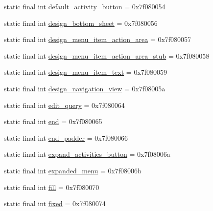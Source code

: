 \begin{DoxyCompactItemize}
\item 
static final int \mbox{\hyperlink{classandroid_1_1support_1_1design_1_1_r_1_1id_a1a434ee67ff2e4175b72e56f1a43d697}{default\+\_\+activity\+\_\+button}} = 0x7f080054
\item 
static final int \mbox{\hyperlink{classandroid_1_1support_1_1design_1_1_r_1_1id_aba38ef769e7a95935e5ae2f4fedea9d6}{design\+\_\+bottom\+\_\+sheet}} = 0x7f080056
\item 
static final int \mbox{\hyperlink{classandroid_1_1support_1_1design_1_1_r_1_1id_adb2647c3319106f9b429a3b5504f5ba5}{design\+\_\+menu\+\_\+item\+\_\+action\+\_\+area}} = 0x7f080057
\item 
static final int \mbox{\hyperlink{classandroid_1_1support_1_1design_1_1_r_1_1id_a8717eee55584a09abece563b626b9709}{design\+\_\+menu\+\_\+item\+\_\+action\+\_\+area\+\_\+stub}} = 0x7f080058
\item 
static final int \mbox{\hyperlink{classandroid_1_1support_1_1design_1_1_r_1_1id_ab894ddc87ea19e63dea6cc1573857be7}{design\+\_\+menu\+\_\+item\+\_\+text}} = 0x7f080059
\item 
static final int \mbox{\hyperlink{classandroid_1_1support_1_1design_1_1_r_1_1id_ad2aa9a71ea43bc8d7fdb4b1dee0c7528}{design\+\_\+navigation\+\_\+view}} = 0x7f08005a
\item 
static final int \mbox{\hyperlink{classandroid_1_1support_1_1design_1_1_r_1_1id_a925f3d0551eda6274ab628e9e89ef681}{edit\+\_\+query}} = 0x7f080064
\item 
static final int \mbox{\hyperlink{classandroid_1_1support_1_1design_1_1_r_1_1id_a7cc4a2356792688c15effb564af06f50}{end}} = 0x7f080065
\item 
static final int \mbox{\hyperlink{classandroid_1_1support_1_1design_1_1_r_1_1id_a9803747fe0a09faf24a2ea39622fffe9}{end\+\_\+padder}} = 0x7f080066
\item 
static final int \mbox{\hyperlink{classandroid_1_1support_1_1design_1_1_r_1_1id_a6c97cb6330a1bda8b2c1f142c7bb8938}{expand\+\_\+activities\+\_\+button}} = 0x7f08006a
\item 
static final int \mbox{\hyperlink{classandroid_1_1support_1_1design_1_1_r_1_1id_a5df7cf5b70c2db787dc229b79c1a7939}{expanded\+\_\+menu}} = 0x7f08006b
\item 
static final int \mbox{\hyperlink{classandroid_1_1support_1_1design_1_1_r_1_1id_a732bd99c00b6c445998253de74af48e5}{fill}} = 0x7f080070
\item 
static final int \mbox{\hyperlink{classandroid_1_1support_1_1design_1_1_r_1_1id_a8c046e12f51095567fcff2b1f8df3f6b}{fixed}} = 0x7f080074

\end{DoxyCompactItemize}
